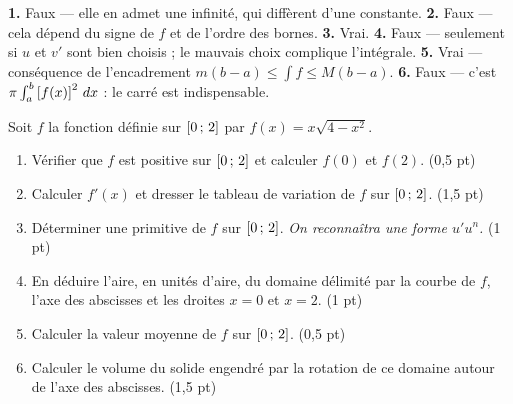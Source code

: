 \begin{corrige}[je me teste]
\textbf{1.} Faux — elle en admet une infinité, qui diffèrent d'une constante.
\textbf{2.} Faux — cela dépend du signe de $f$ et de l'ordre des bornes.
\textbf{3.} Vrai.
\textbf{4.} Faux — seulement si $u$ et $v'$ sont bien choisis ; le mauvais
choix complique l'intégrale.
\textbf{5.} Vrai — conséquence de l'encadrement $m(b-a) \leq \int f \leq M(b-a)$.
\textbf{6.} Faux — c'est $\pi\int_{a}^{b} \left[f(x)\right]^{2}\,dx$ : le carré
est indispensable.
\end{corrige}

\begin{commeaubac}
Soit $f$ la fonction définie sur $\left[0\,;\,2\right]$ par
$f(x) = x\sqrt{4-x^{2}}$.

\begin{enumerate}[label=\textbf{\arabic*.}, leftmargin=*, itemsep=0.25em]
  \item Vérifier que $f$ est positive sur $\left[0\,;\,2\right]$ et calculer
        $f(0)$ et $f(2)$. \hfill\textup{(0,5 pt)}
  \item Calculer $f'(x)$ et dresser le tableau de variation de $f$ sur
        $\left[0\,;\,2\right]$. \hfill\textup{(1,5 pt)}
  \item Déterminer une primitive de $f$ sur $\left[0\,;\,2\right]$.
        \emph{On reconnaîtra une forme $u'u^{n}$.} \hfill\textup{(1 pt)}
  \item En déduire l'aire, en unités d'aire, du domaine délimité par la courbe
        de $f$, l'axe des abscisses et les droites $x=0$ et $x=2$.
        \hfill\textup{(1 pt)}
  \item Calculer la valeur moyenne de $f$ sur $\left[0\,;\,2\right]$.
        \hfill\textup{(0,5 pt)}
  \item Calculer le volume du solide engendré par la rotation de ce domaine
        autour de l'axe des abscisses. \hfill\textup{(1,5 pt)}
\end{enumerate}
\end{commeaubac}

